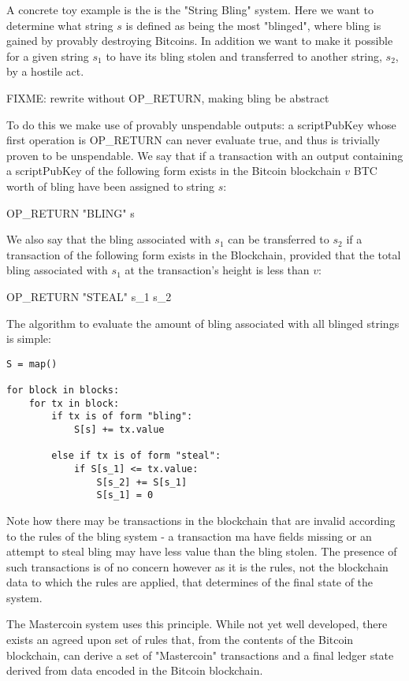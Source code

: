 \documentclass{article}
\begin{document}
A concrete toy example is the is the "String Bling" system. Here we want to
determine what string $s$ is defined as being the most "blinged", where bling
is gained by provably destroying Bitcoins. In addition we want to make it
possible for a given string $s_1$ to have its bling stolen and transferred to
another string, $s_2$, by a hostile act.

FIXME: rewrite without OP\_RETURN, making bling be abstract

To do this we make use of provably unspendable
outputs\cite{provably_unspendable}: a scriptPubKey whose first operation is
OP\_RETURN can never evaluate true, and thus is trivially proven to be
unspendable. We say that if a transaction with an output containing a
scriptPubKey of the following form exists in the Bitcoin blockchain $v$ BTC
worth of bling have been assigned to string $s$:

OP\_RETURN "BLING" s

We also say that the bling associated with $s_1$ can be transferred to $s_2$ if
a transaction of the following form exists in the Blockchain, provided that the
total bling associated with $s_1$ at the transaction's height is less than $v$:

OP\_RETURN "STEAL" s\_1 s\_2

The algorithm to evaluate the amount of bling associated with all blinged strings is simple:

\begin{verbatim}
S = map()

for block in blocks:
    for tx in block:
        if tx is of form "bling":
            S[s] += tx.value

        else if tx is of form "steal":
            if S[s_1] <= tx.value:
                S[s_2] += S[s_1]
                S[s_1] = 0
\end{verbatim}

Note how there may be transactions in the blockchain that are invalid according
to the rules of the bling system - a transaction ma have fields missing or an
attempt to steal bling may have less value than the bling stolen. The presence
of such transactions is of no concern however as it is the rules, not the
blockchain data to which the rules are applied, that determines of the final
state of the system.

The Mastercoin system uses this principle. While not yet well developed, there
exists an agreed upon set of rules that, from the contents of the Bitcoin
blockchain, can derive a set of "Mastercoin" transactions and a final ledger
state derived from data encoded in the Bitcoin blockchain.
\end{document}
